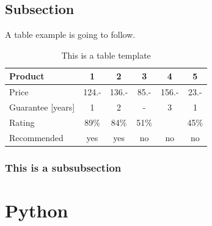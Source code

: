 \subsection{Subsection}

A table example is going to follow.

\begin{table}[H]
\centering
\caption{This is a table template}
\begin{tabular}{|l|c|c|c|c|c|}
\hline
Product & 1 & 2 & 3 & 4 & 5\\
\hline
Price & 124.- & 136.- & 85.- & 156.- & 23.-\\
Guarantee [years] & 1 & 2 & - & 3 & 1\\
Rating & 89\% & 84\% & 51\% & & 45\%\\
\hline
\hline
Recommended & yes & yes & no & no & no\\
\hline
\end{tabular}
\label{tab:template2}
\end{table}
\subsubsection{This is a subsubsection}

\section{Python}



